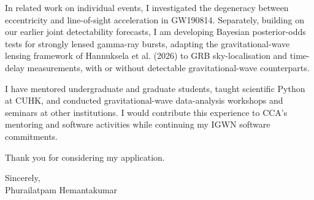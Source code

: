 \documentclass[11pt]{article}
\begin{document}
In related work on individual events, I investigated the degeneracy between eccentricity and line-of-sight acceleration in GW190814. Separately, building on our earlier joint detectability forecasts, I am developing Bayesian posterior-odds tests for strongly lensed gamma-ray bursts, adapting the gravitational-wave lensing framework of Hannuksela et al. (2026) to GRB sky-localisation and time-delay measurements, with or without detectable gravitational-wave counterparts.

I have mentored undergraduate and graduate students, taught scientific Python at CUHK, and conducted gravitational-wave data-analysis workshops and seminars at other institutions. I would contribute this experience to CCA's mentoring and software activities while continuing my IGWN software commitments.

Thank you for considering my application.

Sincerely,\\[4pt]
Phurailatpam Hemantakumar
\end{document}
